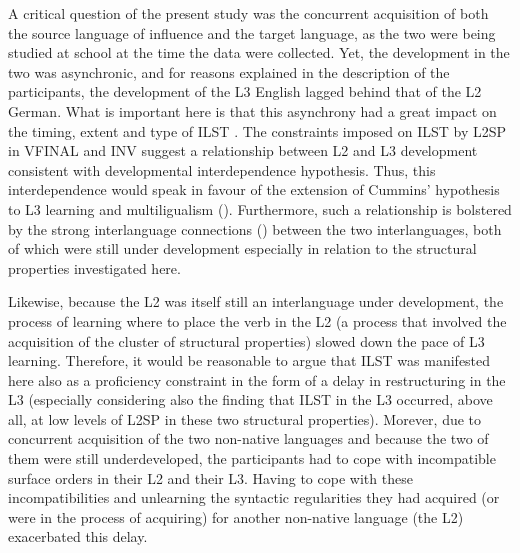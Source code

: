 \documentclass[output=paper,modfonts,nonflat, newtxmath]{langsci/langscibook}
\begin{document}
A critical question of the present study was the concurrent acquisition of both the source language of influence and the target language, as the two were being studied at school at the time the data were collected. Yet, the development in the two was asynchronic, and for reasons explained in the description of the participants, the development of the L3 English lagged behind that of the L2 German. What is important here is that this asynchrony had a great impact on the timing, extent and type of ILST \citep{MontrulEtAl2011}. The constraints imposed on ILST by L2SP in VFINAL and INV suggest a relationship between L2 and L3 development consistent with  developmental interdependence hypothesis. Thus, this interdependence would speak in favour of the extension of Cummins’ hypothesis to L3 learning and multiligualism (\citealt{Chumbow1981, Thomas1988, Abunuwara1992, Cenoz2000}). Furthermore, such a relationship is bolstered by the strong interlanguage connections (\citealt{Bartlet1989,DechertRaupach1989, Dechert2006, HallEtAl2009}) between the two interlanguages, both of which were still under development especially in relation to the structural properties investigated here.

 Likewise, because the L2 was itself still an interlanguage under development, the process of learning where to place the verb in the L2 (a process that involved the acquisition of the cluster of structural properties) slowed down the pace of L3 learning. Therefore, it would be reasonable to argue that ILST was manifested here also as a proficiency constraint in the form of a delay in restructuring in the L3 (especially considering also the finding that ILST in the L3 occurred, above all, at low levels of L2SP in these two structural properties). Morever, due to concurrent acquisition of the two non-native languages and because the two of them were still underdeveloped, the participants had to cope with incompatible surface orders in their L2 and their L3. Having to cope with these incompatibilities and unlearning the syntactic regularities they had acquired (or were in the process of acquiring) for another non-native language (the L2) exacerbated this delay.
\end{document}
